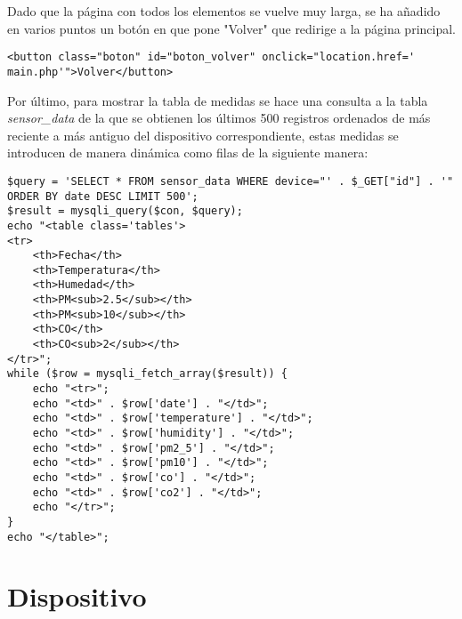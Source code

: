 Dado que la página con todos los elementos se vuelve muy larga, se ha añadido en varios puntos un botón en que pone "Volver" que redirige a la página principal.
\begin{lstlisting}
<button class="boton" id="boton_volver" onclick="location.href=' main.php'">Volver</button>
\end{lstlisting}

Por último, para mostrar la tabla de medidas se hace una consulta a la tabla \textit{sensor\_data} de la que se obtienen los últimos 500 registros ordenados de más reciente a más antiguo del dispositivo correspondiente, estas medidas se introducen de manera dinámica como filas de la siguiente manera:
\begin{lstlisting}
$query = 'SELECT * FROM sensor_data WHERE device="' . $_GET["id"] . '" ORDER BY date DESC LIMIT 500';
$result = mysqli_query($con, $query);
echo "<table class='tables'>
<tr>
    <th>Fecha</th>
    <th>Temperatura</th>
    <th>Humedad</th>
    <th>PM<sub>2.5</sub></th>
    <th>PM<sub>10</sub></th>
    <th>CO</th>
    <th>CO<sub>2</sub></th>
</tr>";
while ($row = mysqli_fetch_array($result)) {
    echo "<tr>";
    echo "<td>" . $row['date'] . "</td>";
    echo "<td>" . $row['temperature'] . "</td>";
    echo "<td>" . $row['humidity'] . "</td>";
    echo "<td>" . $row['pm2_5'] . "</td>";
    echo "<td>" . $row['pm10'] . "</td>";
    echo "<td>" . $row['co'] . "</td>";
    echo "<td>" . $row['co2'] . "</td>";
    echo "</tr>";
}
echo "</table>";
\end{lstlisting}

\section{Dispositivo}\label{sec:implDispositivo}